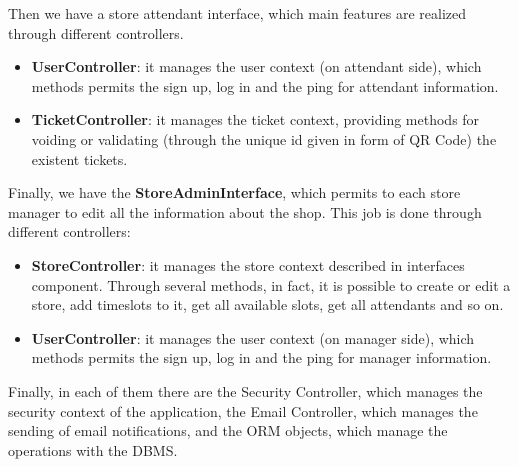 \documentclass[table, 12pt]{article}
\begin{document}
Then we have a store attendant interface, which main features are realized through different controllers.
\begin{itemize}
    \item \textbf{UserController}: it manages the user context (on attendant side), which methods permits the sign up, log in and the ping for attendant information.
    \item \textbf{TicketController}: it manages the ticket context, providing methods for voiding or validating (through the unique id given in form of QR Code) the existent tickets.
\end{itemize}

Finally, we have the \textbf{StoreAdminInterface}, which permits to each store manager to edit all the information about the shop. This job is done through different controllers:
\begin{itemize}
    \item \textbf{StoreController}: it manages the store context described in interfaces component. Through several methods, in fact, it is possible to create or edit a store, add timeslots to it, get all available slots, get all attendants and so on.
    \item \textbf{UserController}: it manages the user context (on manager side), which methods permits the sign up, log in and the ping for manager information.
\end{itemize}

Finally, in each of them there are the Security Controller, which manages the security context of the application, the Email Controller, which manages the sending of email notifications, and the ORM objects, which manage the operations with the DBMS.
\end{document}

